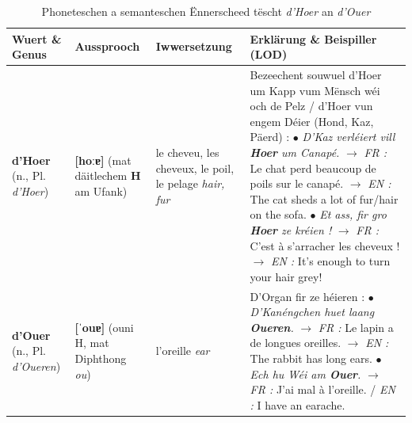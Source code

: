 \begin{table}[htbp]
    \centering
    \begin{tabular}{p{3.0cm}p{2.5cm}p{2.2cm}p{7.5cm}}
        \toprule
        \textbf{Wuert \& Genus} & \textbf{Aussprooch} & \textbf{Iwwersetzung} & \textbf{Erklärung \& Beispiller (LOD)} \\
        \midrule
        \textbf{d'Hoer} \newline (n., Pl. \textit{d'Hoer}) & \textbf{[hoːɐ]} \newline (mat däitlechem \textbf{H} am Ufank) & le cheveu, les cheveux, le poil, le pelage \newline \textit{hair, fur} & Bezeechent souwuel d'Hoer um Kapp vum Mënsch wéi och de Pelz / d'Hoer vun engem Déier (Hond, Kaz, Päerd) : \newline $\bullet$ \textit{D'Kaz verléiert vill \textbf{Hoer} um Canapé.} \newline $\rightarrow$ \textit{FR :} Le chat perd beaucoup de poils sur le canapé. \newline $\rightarrow$ \textit{EN :} The cat sheds a lot of fur/hair on the sofa. \newline $\bullet$ \textit{Et ass, fir gro \textbf{Hoer} ze kréien !} \newline $\rightarrow$ \textit{FR :} C'est à s'arracher les cheveux ! \newline $\rightarrow$ \textit{EN :} It's enough to turn your hair grey! \\
        \midrule
        \textbf{d'Ouer} \newline (n., Pl. \textit{d'Oueren}) & \textbf{[ˈouɐ]} \newline (ouni H, mat Diphthong \textit{ou}) & l'oreille \newline \textit{ear} & D'Organ fir ze héieren : \newline $\bullet$ \textit{D'Kanéngchen huet laang \textbf{Oueren}.} \newline $\rightarrow$ \textit{FR :} Le lapin a de longues oreilles. \newline $\rightarrow$ \textit{EN :} The rabbit has long ears. \newline $\bullet$ \textit{Ech hu Wéi am \textbf{Ouer}.} \newline $\rightarrow$ \textit{FR :} J'ai mal à l'oreille. / \textit{EN :} I have an earache. \\
        \bottomrule
    \end{tabular}
    \caption{Phoneteschen a semanteschen Ënnerscheed tëscht \textit{d'Hoer} an \textit{d'Ouer}}
\end{table}

